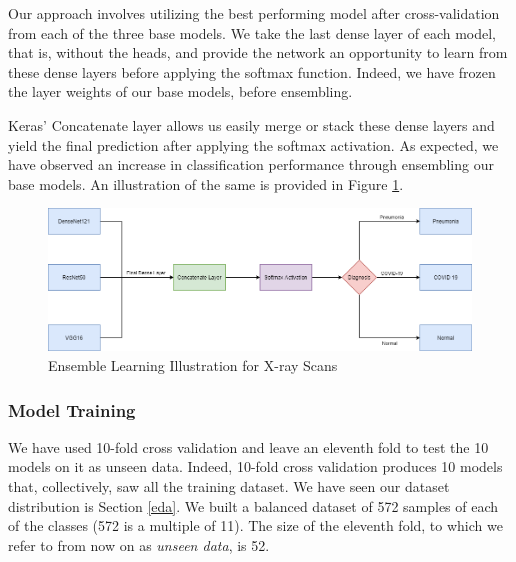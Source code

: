 Our approach involves utilizing the best performing model after cross-validation from each of the three base models. We take the last dense layer of each model, that is, without the heads, and provide the network an opportunity to learn from these dense layers before applying the softmax function. Indeed, we have frozen the layer weights of our base models, before ensembling. 

Keras' Concatenate layer \cite{CON} allows us easily merge or stack these dense layers and yield the final prediction after applying the softmax activation. As expected, we have observed an increase in classification performance through ensembling our base models. An illustration of the same is provided in Figure \ref{fig:ensemble learning}.

\begin{figure}[H]
	\centering
	\includegraphics[width=15.5cm]{Images/Ensemble.png}
	\caption{\small Ensemble Learning Illustration for X-ray Scans}
	\label{fig:ensemble learning}
\end{figure}


\subsubsection{Model Training}

We have used 10-fold cross validation and leave an eleventh fold to test the 10 models on it as unseen data. Indeed, 10-fold cross validation produces 10 models that, collectively, saw all the training dataset. We have seen our dataset distribution is Section \ref{eda}. We built a balanced dataset of 572 samples of each of the classes (572 is a multiple of 11). The size of the eleventh fold, to which we refer to from now on as \textit{unseen data}, is 52. 

